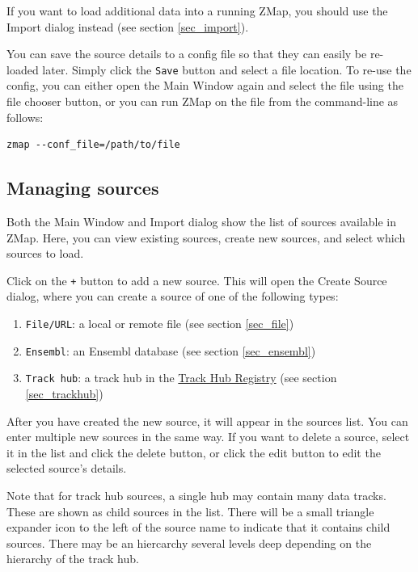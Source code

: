 \documentclass[letterpaper]{article}
\begin{document}
If you want to load additional data into a running ZMap, you should use the Import dialog instead (see section \ref{sec_import}).

You can save the source details to a config file so that they can easily be re-loaded later. Simply click the \lstinline{Save} button and select a file location. To re-use the config, you can either open the Main Window again and select the file using the file chooser button, or you can run ZMap on the file from the command-line as follows:

\begin{lstlisting}
zmap --conf_file=/path/to/file
\end{lstlisting}

\subsection{Managing sources}
\label{sec_managing_sources}
Both the Main Window and Import dialog show the list of sources available in ZMap. Here, you can view existing sources, create new sources, and select which sources to load.

Click on the \lstinline{+} button to add a new source. This will open the Create Source dialog, where you can create a source of one of the following types:

\begin{enumerate}
\item \lstinline{File/URL}: a local or remote file (see section \ref{sec_file})
\item \lstinline{Ensembl}: an Ensembl database (see section \ref{sec_ensembl})
\item \lstinline{Track hub}: a track hub in the \href{http://trackhubregistry.org/}{Track Hub Registry} (see section \ref{sec_trackhub})
\end{enumerate}

After you have created the new source, it will appear in the sources list. You can enter multiple new sources in the same way. If you want to delete a source, select it in the list and click the delete button, or click the edit button to edit the selected source's details.

Note that for track hub sources, a single hub may contain many data tracks. These are shown as child sources in the list. There will be a small triangle expander icon to the left of the source name to indicate that it contains child sources. There may be an hiercarchy several levels deep depending on the hierarchy of the track hub.
\end{document}
